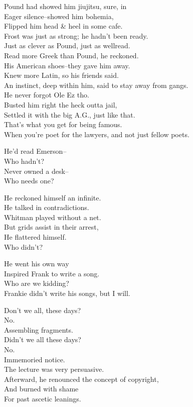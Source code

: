 Pound had showed him jiujitsu, sure, in \\
Eager silence--showed him bohemia, \\
Flipped him head \& heel in some cafe. \\
Frost was just as strong; he hadn't been ready. \\
Just as clever as Pound, just as wellread. \\
Read more Greek than Pound, he reckoned. \\
His American shoes--they gave him away. \\
Knew more Latin, so his friends said. \\
An instinct, deep within him, said to stay away from gangs. \\
He never forgot Ole Ez tho.  \\
Busted him right the heck outta jail, \\
Settled it with the big A.G., just like that. \\
That's what you get for being famous. \\
When you're poet for the lawyers, and not just fellow poets.

\secdiv 

He'd read Emerson-- \\
Who hadn't? \\
Never owned a desk-- \\
Who needs one? 

He reckoned himself an infinite. \\
He talked in contradictions. \\
Whitman played without a net. \\
But grids assist in their arrest, \\
He flattered himself. \\
Who didn't?

He went his own way \\
Inspired Frank to write a song. \\
Who are we kidding? \\
Frankie didn't write his songs, but I will.

Don't we all, these days? \\
No. \\
Assembling fragments. \\
Didn't we all these days? \\
No. \\
Immemoried notice. \\
The lecture was very persuasive. \\
Afterward, he renounced the concept of copyright, \\
And burned with shame \\
For past ascetic leanings. %